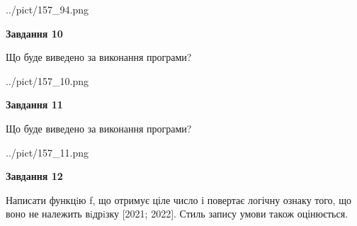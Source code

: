 \documentclass[12pt, ukrainian]{article}
\begin{document}
{\begin {large}
\begin{center}
	{../pict/157_94.png}
\end{center}
\newpage

{\begin {center}\textbf{Завдання 10}\end {center}}

Що буде виведено за виконання програми?\par
\begin{center}
	{../pict/157_10.png}
\end{center}
\newpage

{\begin {center}\textbf{Завдання 11}\end {center}}

Що буде виведено за виконання програми?\par
\begin{center}
	{../pict/157_11.png}
\end{center}
\newpage

{\begin {center}\textbf{Завдання 12}\end {center}}


Написати функцiю f, що отримує ціле число і повертає логічну ознаку того, що воно не належить вiдрiзку [2021; 2022]. Стиль запису умови також оцінюється.\par
\newpage

\end {large}}
\end{document}
